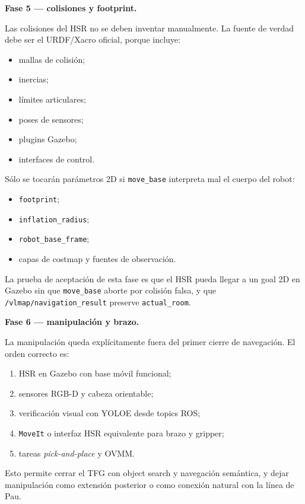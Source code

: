 \documentclass[11pt,a4paper]{article}
\begin{document}
\textbf{Fase 5 --- colisiones y footprint.}

Las colisiones del HSR no se deben inventar manualmente. La fuente de verdad
debe ser el URDF/Xacro oficial, porque incluye:

\begin{itemize}
  \item mallas de colisión;
  \item inercias;
  \item límites articulares;
  \item poses de sensores;
  \item plugins Gazebo;
  \item interfaces de control.
\end{itemize}

Sólo se tocarán parámetros 2D si \texttt{move\_base} interpreta mal el cuerpo
del robot:

\begin{itemize}
  \item \texttt{footprint};
  \item \texttt{inflation\_radius};
  \item \texttt{robot\_base\_frame};
  \item capas de costmap y fuentes de observación.
\end{itemize}

La prueba de aceptación de esta fase es que el HSR pueda llegar a un goal 2D en
Gazebo sin que \texttt{move\_base} aborte por colisión falsa, y que
\texttt{/vlmap/navigation\_result} preserve \texttt{actual\_room}.

\textbf{Fase 6 --- manipulación y brazo.}

La manipulación queda explícitamente fuera del primer cierre de navegación. El
orden correcto es:

\begin{enumerate}
  \item HSR en Gazebo con base móvil funcional;
  \item sensores RGB-D y cabeza orientable;
  \item verificación visual con YOLOE desde topics ROS;
  \item \texttt{MoveIt} o interfaz HSR equivalente para brazo y gripper;
  \item tareas \emph{pick-and-place} y OVMM.
\end{enumerate}

Esto permite cerrar el TFG con object search y navegación semántica, y dejar
manipulación como extensión posterior o como conexión natural con la línea de
Pau.
\end{document}
